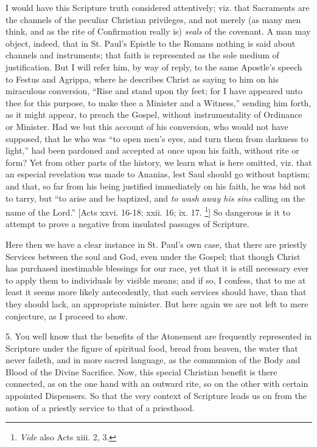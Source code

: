 I would have this Scripture truth considered attentively; viz. that
Sacraments are the channels of the peculiar Christian privileges, and
not merely (as many men think, and as the rite of Confirmation really
is) \emph{seals} of the covenant. A man may object, indeed, that in St.
Paul's Epistle to the Romans nothing is said about channels and
instruments; that faith is represented as the sole medium of
justification. But I will refer him, by way of reply, to the same
Apostle's speech to Festus and Agrippa, where he describes Christ as
saying to him on his miraculous conversion, ``Rise and stand upon
thy feet; for I have appeared unto thee for this purpose, to make thee a
Minister and a Witness,'' sending him forth, as it might appear, to
preach the Gospel, without instrumentality of Ordinance or Minister. Had
we but this account of his conversion, who would not have supposed, that
he who was ``to open men's eyes, and turn them from darkness to
light,'' had been pardoned and accepted at once upon his faith,
without rite or form? Yet from other parts of the history, we learn what
is here omitted, viz. that an especial revelation was made to Ananias,
lest Saul should go without baptism; and that, so far from his being
justified immediately on his faith, he was bid not to tarry, but
``to arise and be baptized, and \emph{to wash away his sins} calling
on the name of the Lord.'' [Acts xxvi. 16-18; xxii. 16; ix. 17. \footnote{\emph{Vide} also Acts xiii. 2,
3.}] So dangerous is it to attempt to prove a negative from insulated
passages of Scripture.

Here then we have a clear instance in St. Paul's own case, that there
are priestly Services between the soul and God, even under the Gospel;
that though Christ has purchased inestimable blessings for our race, yet
that it is still necessary ever to apply them to individuals by visible
means; and if so, I confess, that to me at least it seems more likely
antecedently, that such services should have, than that they should
lack, an appropriate minister. But here again we are not left to mere
conjecture, as I proceed to show.

5. You well know that the benefits of the Atonement are frequently
represented in Scripture under the figure of spiritual food, bread from
heaven, the water that never faileth, and in more sacred language, as
the communion of the Body and Blood of the Divine Sacrifice. Now, this
special Christian benefit is there connected, as on the one hand with an
outward rite, so on the other with certain appointed Dispensers. So that
the very context of Scripture leads us on from the notion of a priestly
service to that of a priesthood.


